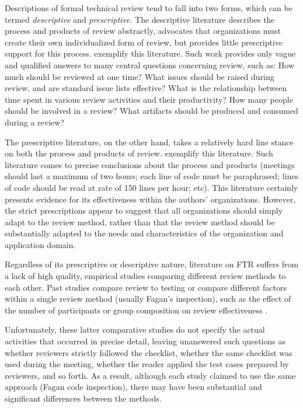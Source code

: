 Descriptions of formal technical review tend to fall
into two forms, which can be termed {\em descriptive}\/ and {\em
prescriptive}.  The descriptive literature describes the process and
products of review abstractly, advocates that organizations must create
their own individualized form of review, but provides little prescriptive
support for this process.  \cite{Schulmeyer87,Dunn90,Freedman90} exemplify
this literature.  Such work provides only vague and qualified answers to
many central questions concerning review, such as: How much should be
reviewed at one time? What issues should be raised during review, and are
standard issue lists effective? What is the relationship between time spent
in various review activities and their productivity? How many people should
be involved in a review? What artifacts should be produced and consumed
during a review?

The prescriptive literature, on the other hand, takes a relatively hard
line stance on both the process and products of review.
\cite{Fagan76,Fagan86,Russell91} exemplify this literature.  Such
literature comes to precise conclusions about the process and products
(meetings should last a maximum of two hours; each line of code must be
paraphrased; lines of code should be read at rate of 150 lines per hour;
etc).  This literature certainly presents evidence for its effectiveness
within the authors' organizations.  However, the strict prescriptions
appear to suggest that all organizations should simply adapt to the review
method, rather than that the review method should be substantially adapted
to the needs and characteristics of the organization and application
domain.

Regardless of its prescriptive or descriptive nature, literature on FTR
suffers from a lack of high quality, empirical studies comparing different
review methods to each other.  Past studies compare review to testing
\cite{Myers78,Hetzel76,Basili85} or compare different factors within a
single review method (usually Fagan's inspection), such as the effect of
the number of participants or group composition on review effectiveness
\cite{Bisant89,Martin90}.

Unfortunately, these latter comparative studies do not specify the actual
activities that occurred in precise detail, leaving unanswered such
questions as whether reviewers strictly followed the checklist, whether the
same checklist was used during the meeting, whether the reader applied the
test cases prepared by reviewers, and so forth. As a result, although each
study claimed to use the same approach (Fagan code inspection), there may
have been substantial and significant differences between the methods.

